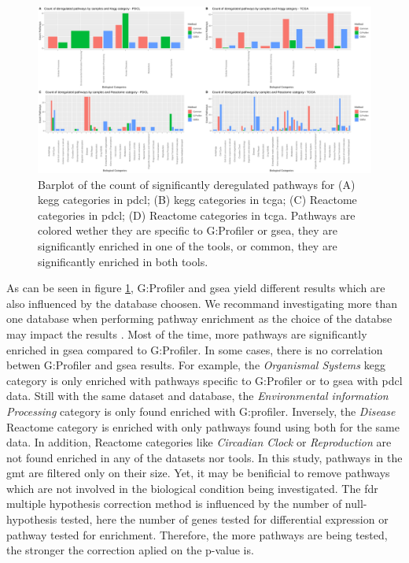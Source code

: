 \begin{figure}
    \includegraphics[width=\textwidth]{img/barplot-categ-global}
    \caption{
        Barplot of the count of significantly deregulated pathways for (A) \acrshort{kegg} categories in \acrshort{pdcl}; (B) \acrshort{kegg} categories in \acrshort{tcga}; (C) Reactome categories in \acrshort{pdcl}; (D) Reactome categories in \acrshort{tcga}.
        Pathways are colored wether they are specific to G:Profiler or \acrshort{gsea}, they are significantly enriched in one of the tools, or common, they are significantly enriched in both tools.
    }
    \label{fig:barplot-categ-global}
\end{figure}

As can be seen in figure \ref*{fig:barplot-categ-global}, G:Profiler and \acrshort{gsea} yield different results which are also influenced by the database choosen.
We recommand investigating more than one database when performing pathway enrichment as the choice of the databse may impact the results \cite*{Mubeen2019}.
Most of the time, more pathways are significantly enriched in \acrshort{gsea} compared to G:Profiler.
In some cases, there is no correlation betwen G:Profiler and \acrshort{gsea} results.
For example, the \textit{Organismal Systems} \acrshort{kegg} category is only enriched with pathways specific to G:Profiler or to \acrshort{gsea} with \acrshort{pdcl} data.
Still with the same dataset and database, the \textit{Environmental information Processing} category is only found enriched with G:profiler.
Inversely, the \textit{Disease} Reactome category is enriched with only pathways found using both for the same data.
In addition, Reactome categories like \textit{Circadian Clock} or \textit{Reproduction} are not found enriched in any of the datasets nor tools.
In this study, pathways in the \acrshort{gmt} are filtered only on their size.
Yet, it may be benificial to remove pathways which are not involved in the biological condition being investigated.
The \acrshort{fdr} multiple hypothesis correction method is influenced by the number of null-hypothesis tested, here the number of genes tested for differential expression or pathway tested for enrichment.
Therefore, the more pathways are being tested, the stronger the correction aplied on the p-value is.

